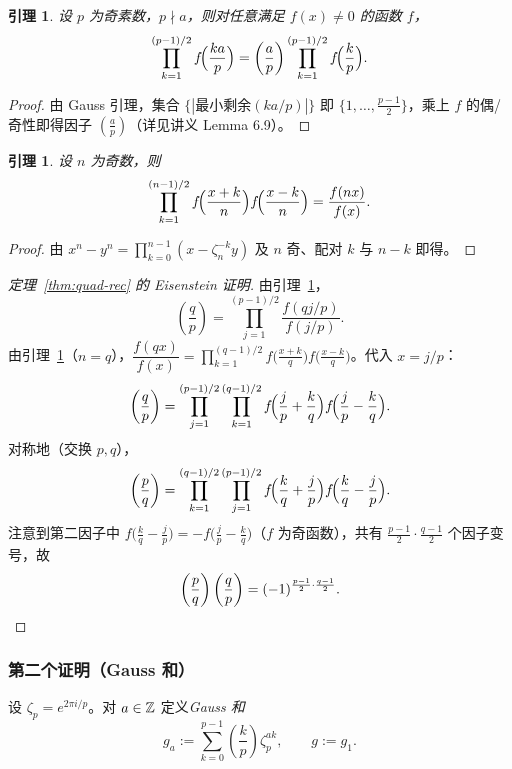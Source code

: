 \documentclass{article}
\newcommand{\leg}[2]{\left(\frac{#1}{#2}\right)}
\theoremstyle{plain}
\newtheorem{lem}[thm]{引理}
\theoremstyle{definition}
\theoremstyle{remark}
\begin{document}
\begin{lem}\label{lem:eps-mult}
  设 $p$ 为奇素数，$p\nmid a$，则对任意满足 $f(x)\ne0$ 的函数 $f$，
  \[
    \prod_{k=1}^{(p-1)/2}f\!\Bigl(\frac{ka}{p}\Bigr)=\leg{a}{p}\prod_{k=1}^{(p-1)/2}f\!\Bigl(\frac{k}{p}\Bigr).
  \]
\end{lem}

\begin{proof}
  由 Gauss 引理，集合 $\{|\text{最小剩余}(ka/p)|\}$ 即 $\{1,\dots,\frac{p-1}{2}\}$，乘上 $f$ 的偶/奇性即得因子 $\leg{a}{p}$（详见讲义 Lemma 6.9）。
\end{proof}

\begin{lem}\label{lem:eps-prod}
  设 $n$ 为奇数，则
  \[
    \prod_{k=1}^{(n-1)/2}f\!\Bigl(\frac{x+k}{n}\Bigr)f\!\Bigl(\frac{x-k}{n}\Bigr)=\frac{f(nx)}{f(x)}.
  \]
\end{lem}

\begin{proof}
  由 $x^n-y^n=\prod_{k=0}^{n-1}(x-\zeta_n^{-k}y)$ 及 $n$ 奇、配对 $k$ 与 $n-k$ 即得。
\end{proof}

\begin{proof}[定理~\ref{thm:quad-rec} 的 Eisenstein 证明]
  由引理~\ref{lem:eps-mult}，
  \[
    \leg{q}{p}=\prod_{j=1}^{(p-1)/2}\frac{f(qj/p)}{f(j/p)}.
  \]
  由引理~\ref{lem:eps-prod}（$n=q$），$\dfrac{f(qx)}{f(x)}=\prod_{k=1}^{(q-1)/2}f\!\bigl(\tfrac{x+k}{q}\bigr)f\!\bigl(\tfrac{x-k}{q}\bigr)$。代入 $x=j/p$：
  \[
    \leg{q}{p}=\prod_{j=1}^{(p-1)/2}\prod_{k=1}^{(q-1)/2}f\!\Bigl(\frac{j}{p}+\frac{k}{q}\Bigr)f\!\Bigl(\frac{j}{p}-\frac{k}{q}\Bigr).
  \]
  对称地（交换 $p,q$），
  \[
    \leg{p}{q}=\prod_{k=1}^{(q-1)/2}\prod_{j=1}^{(p-1)/2}f\!\Bigl(\frac{k}{q}+\frac{j}{p}\Bigr)f\!\Bigl(\frac{k}{q}-\frac{j}{p}\Bigr).
  \]
  注意到第二因子中 $f\!\bigl(\tfrac{k}{q}-\tfrac{j}{p}\bigr)=-f\!\bigl(\tfrac{j}{p}-\tfrac{k}{q}\bigr)$（$f$ 为奇函数），共有 $\frac{p-1}{2}\cdot\frac{q-1}{2}$ 个因子变号，故
  \[
    \leg{p}{q}\leg{q}{p}=(-1)^{\frac{p-1}{2}\cdot\frac{q-1}{2}}. \qedhere
  \]
\end{proof}

\subsubsection*{第二个证明（Gauss 和）}

设 $\zeta_p=e^{2\pi i/p}$。对 $a\in\mathbb{Z}$ 定义\emph{Gauss 和}
\[
  g_a:=\sum_{k=0}^{p-1}\leg{k}{p}\zeta_p^{ak},\qquad g:=g_1.
\]
\end{document}
